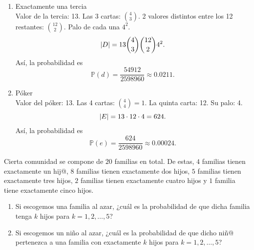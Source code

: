 \message{ !name(tarea2.tex)}\documentclass[12pt,a4paper]{article}
\begin{document}
\begin{solucion}
\begin{enumerate}
            Así, la probabilidad es
            \begin{equation*}
                \mathbb{P}(c)=\frac{123552}{2598960}\approx0.0475.
            \end{equation*}
            \item[(d)] Exactamente una tercia\\
            Valor de la tercia: 13. Las 3 cartas: $\binom{4}{3}$. 2 valores distintos entre los 12 restantes:
            $\binom{12}{2}$. Palo de cada una $4^{2}$.
            \begin{equation*}
                \abs{D}=13\binom{4}{3}\binom{12}{2}4^{2}.
            \end{equation*}
            Así, la probabilidad es
            \begin{equation*}
                \mathbb{P}(d)=\frac{54912}{2598960}\approx0.0211.
            \end{equation*}
            \item[(e)] Póker\\
            Valor del póker: 13. Las 4 cartas: $\binom{4}{4}=1$. La quinta carta: 12. Su palo: 4.
            \begin{equation*}
                \abs{E}=13\cdot12\cdot4=624.
            \end{equation*}
            Así, la probabilidad es
            \begin{equation*}
                \mathbb{P}(e)=\frac{624}{2598960}\approx0.00024.
            \end{equation*}
        \end{enumerate}
    \end{solucion}

    \begin{mdframed}[style=mdbluebox,frametitle={Ejercicio 5}]
        Cierta comunidad se compone de $20$ familias en total. De estas, 
        $4$ familias tienen exactamente un hij@, 
        $8$ familias tienen exactamente dos hijos, 
        $5$ familias tienen exactamente tres hijos, 
        $2$ familias tienen exactamente cuatro hijos y 
        $1$ familia tiene exactamente cinco hijos.

        \begin{enumerate}
            \item[(a)] Si escogemos una familia al azar, ¿cuál es la probabilidad de que dicha familia tenga $k$ hijos para $k=1,2,\dots,5$?
            \item[(b)] Si escogemos un niño al azar, ¿cuál es la probabilidad de que dicho niñ@ pertenezca a una familia con exactamente $k$ hijos para $k=1,2,\dots,5$?
        \end{enumerate}
    \end{mdframed}
\end{document}
